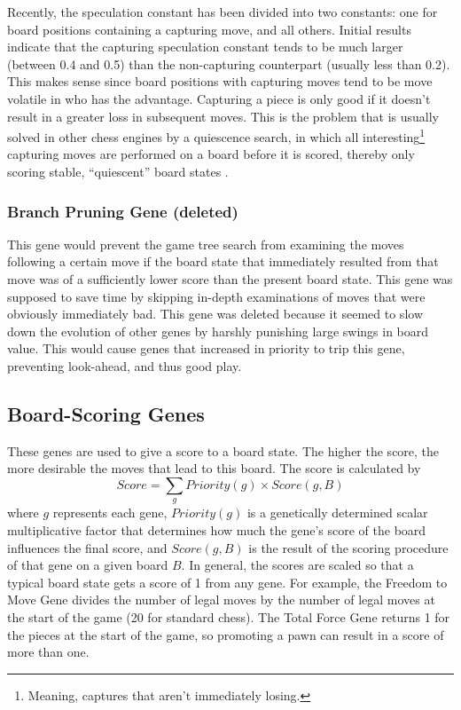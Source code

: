 \documentclass[letterpaper]{article}
\renewcommand{\_}{\allowbreak\textunderscore\allowbreak}
\begin{document}
Recently, the speculation constant has been divided into two constants: one for board positions containing a capturing move, and all others. Initial results indicate that the capturing speculation constant tends to be much larger (between 0.4 and 0.5) than the non-capturing counterpart (usually less than 0.2). This makes sense since board positions with capturing moves tend to be move volatile in who has the advantage. Capturing a piece is only good if it doesn't result in a greater loss in subsequent moves. This is the problem that is usually solved in other chess engines by a quiescence search, in which all interesting\footnote{Meaning, captures that aren't immediately losing.} capturing moves are performed on a board before it is scored, thereby only scoring stable, ``quiescent'' board states \cite{quiescence-ref}.

\subsubsection{Branch Pruning Gene (deleted)}

This gene would prevent the game tree search from examining the moves following a certain move if the board state that immediately resulted from that move was of a sufficiently lower score than the present board state. This gene was supposed to save time by skipping in-depth examinations of moves that were obviously immediately bad. This gene was deleted because it seemed to slow down the evolution of other genes by harshly punishing large swings in board value. This would cause genes that increased in priority to trip this gene, preventing look-ahead, and thus good play.

\subsection{Board-Scoring Genes}
\label{board-score-section}
These genes are used to give a score to a board state. The higher the score, the more desirable the moves that lead to this board. The score is calculated by
\[Score = \sum_g Priority(g) \times Score(g,B)\]
where \(g\) represents each gene, \(Priority(g)\) is a genetically determined scalar multiplicative factor that determines how much the gene's score of the board influences the final score, and \(Score(g,B)\) is the result of the scoring procedure of that gene on a given board \(B\). In general, the scores are scaled so that a typical board state gets a score of 1 from any gene. For example, the Freedom to Move Gene divides the number of legal moves by the number of legal moves at the start of the game (20 for standard chess). The Total Force Gene returns 1 for the pieces at the start of the game, so promoting a pawn can result in a score of more than one.
\end{document}
